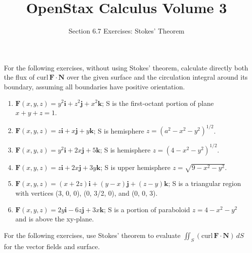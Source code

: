 \documentclass{exercises}
\title{OpenStax Calculus Volume 3}
\subtitle{Section 6.7 Exercises: Stokes’ Theorem}
\author{}
\date{}
\begin{document}
\maketitle


For the following exercises, without using Stokes' theorem, calculate directly both the flux of $\text{curl}\,\mathbf{F}\cdot \mathbf{N}$ over the given surface and the circulation integral around its boundary, assuming all boundaries have positive orientation.

\begin{enumerate}[start=1]
\item $\mathbf{F}(x,y,z)=y^{2}\mathbf{i}+z^{2}\mathbf{j}+x^{2}\mathbf{k}$; S is the first-octant portion of plane $x+y+z=1$.
\item $\mathbf{F}(x,y,z)=z\mathbf{i}+x\mathbf{j}+y\mathbf{k}$; S is hemisphere $z={(a^{2}-x^{2}-y^{2})}^{1/2}$.
\item $\mathbf{F}(x,y,z)=y^{2}\mathbf{i}+2x\mathbf{j}+5\mathbf{k}$; S is hemisphere $z={(4-x^{2}-y^{2})}^{1/2}$.
\item $\mathbf{F}(x,y,z)=z\mathbf{i}+2x\mathbf{j}+3y\mathbf{k}$; S is upper hemisphere $z=\sqrt{9-x^{2}-y^{2}}$.
\item $\mathbf{F}(x,y,z)=(x+2z)\mathbf{i}+(y-x)\mathbf{j}+(z-y)\mathbf{k}$; S is a triangular region with vertices (3, 0, 0), (0, 3/2, 0), and (0, 0, 3).
\item $\mathbf{F}(x,y,z)=2y\mathbf{i}-6z\mathbf{j}+3x\mathbf{k}$; S is a portion of paraboloid $z=4-x^{2}-y^{2}$ and is above the xy-plane.
\end{enumerate}

For the following exercises, use Stokes' theorem to evaluate $\iint_{S}(\text{curl}\,\mathbf{F}\cdot \mathbf{N})\,dS$ for the vector fields and surface.
\end{document}
